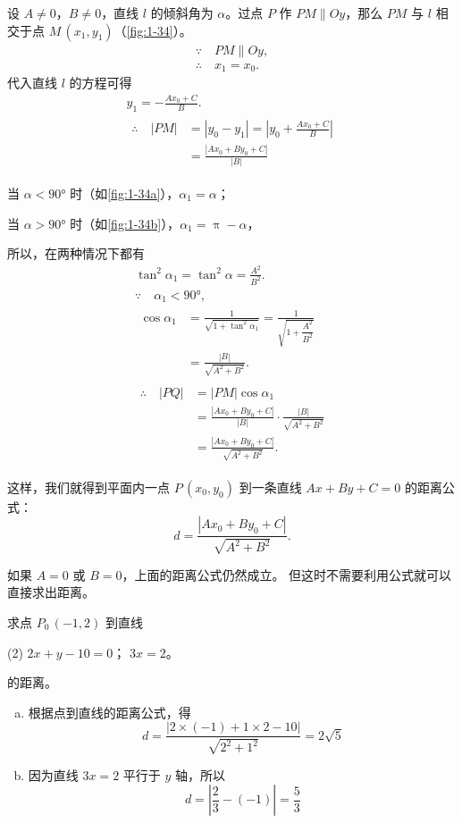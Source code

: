 设 $A\neq 0$，$B\neq 0$，直线 $l$ 的倾斜角为 $\alpha$。过点 $P$ 作 $PM\parallel Oy$，那么 $PM$ 与 $l$ 相交于点 $M\,(x_1,y_1)$（\cref{fig:1-34}）。
\begin{gather*}
\because \quad PM\parallel Oy,\\
\therefore \quad x_1=x_0.
\end{gather*}
代入直线 $l$ 的方程可得
\begin{gather*}
  y_1=-\frac{Ax_0+C}{B}.\\
  \begin{split}
  \therefore\quad |PM| & =|y_0-y_1|=\left|y_0+\frac{Ax_0+C}{B}\right|\\
                  & = \frac{|Ax_0+By_0+C|}{|B|}
  \end{split}
\end{gather*}

当 $\alpha<\ang{90}$ 时（如\cref{fig:1-34a}），$\alpha_1=\alpha$；

当 $\alpha>\ang{90}$ 时（如\cref{fig:1-34b}），$\alpha_1= \uppi-\alpha$，

所以，在两种情况下都有
\begin{gather*}
\tan^2\alpha_1=\tan^2\alpha=\frac{A^2}{B^2}.\\
\because \quad \alpha_1< \ang{90},\\
\begin{split}
  \cos\alpha_1&=\frac{1}{\sqrt{1+\tan^2\alpha_1}}=\frac{1}{\sqrt{1+\dfrac{A^2}{B^2}}}\\
   &=\frac{\left| B\right| }{\sqrt{{A}^{2} + {B}^{2}}}.
\end{split}\\
\begin{split}
  \therefore\quad |PQ|&=|PM|\cos\alpha_1\\
   &=\frac{|Ax_0+By_0+C|}{|B|} \cdot \frac{|B|}{\sqrt{A^2+B^2}}\\
   &=\frac{|Ax_0+By_0+C|}{\sqrt{A^2+B^2}}.
\end{split}
\end{gather*}

这样，我们就得到平面内一点 $P\,(x_0,y_0)$ 到一条直线 $Ax+By+C=0$ 的距离公式：
\[ d = \frac{|Ax_0+By_0+C|}{\sqrt{A^2+B^2}}. \]

如果 $A=0$ 或 $B=0$，上面的距离公式仍然成立。
但这时不需要利用公式就可以直接求出距离。

\begin{example}
  求点 $P_0\,(-1,2)$ 到直线 
  \begin{tasks}(2)
    \task $2x+y-10=0$；
    \task $3x=2$。
  \end{tasks}
  的距离。
\end{example}
\begin{solution}
  \begin{enumerate}[a)]
    \item 根据点到直线的距离公式，得
    \[ d=\frac{|2\times(-1)+1\times2-10|}{\sqrt{2^2+1^2}}=2\sqrt{5}\]
    \item 因为直线 $3x=2$ 平行于 $y$ 轴，所以
    \[d=\left|\frac{2}{3}-(-1)\right|=\frac{5}{3}\]
  \end{enumerate}
\end{solution}

